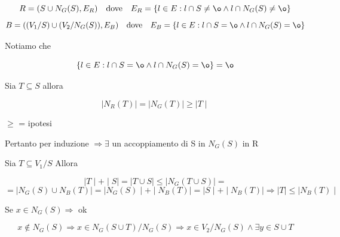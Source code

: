 \documentclass{article}
\begin{document}
\begin{enumerate}
\begin{equation*}
              R=(S \cup N_G(S), E_R) \quad \text{dove} \quad E_R=\{l\in E: l \cap S \neq \o \land l\cap N_G(S) \neq \o \}
            \end{equation*}
            \begin{equation*}
              B=((V_1/S)\cup (V_2/N_G(S)), E_B) \quad \text{dove} \quad E_B=\{l\in E: l \cap S = \o \land l\cap N_G(S) = \o \}
            \end{equation*}
            \begin{flushleft}
              Notiamo che
            \end{flushleft}
            \begin{equation*}
              \{ l \in E: l\cap S=\o \land l\cap N_G(S)=\o\} = \o
            \end{equation*}
            \begin{flushleft}
             Sia $T\subseteq S$ allora  
            \end{flushleft}
            \begin{equation*}
              \mid N_R(T) \mid = \mid N_G(T) \mid \geq \mid T \mid
            \end{equation*}
            \begin{flushleft}
              $\geq$ = ipotesi
            \end{flushleft}
            \begin{flushleft}
              Pertanto per induzione $\Rightarrow \exists$ un accoppiamento di S in $N_G(S)$ in R
            \end{flushleft}
            \begin{flushleft}
              Sia $T \subseteq V_1/S$ Allora 
            \end{flushleft}
            \begin{equation*}
              \mid T \mid + \mid S \mid = \mid T \cup S \mid \leq \mid N_G(T \cup S) \mid =
            \end{equation*}
            \begin{equation*}
              = \mid N_G(S) \cup N_B(T) \mid = \mid N_G(S) \mid + \mid N_B(T) \mid = \mid S \mid + \mid N_B(T) \mid \Rightarrow \mid T \mid \leq \mid N_B(T) \mid 
            \end{equation*}
            \begin{flushleft}
              Se $x\in N_G(S) \Rightarrow$ ok
            \end{flushleft}
            \begin{equation*}
              x\notin N_G(S) \Rightarrow x\in N_G(S\cup T) / N_G(S) \Rightarrow x\in V_2 / N_G(S) \land \exists y\in S \cup T

\end{equation*}
\end{enumerate}
\end{document}
